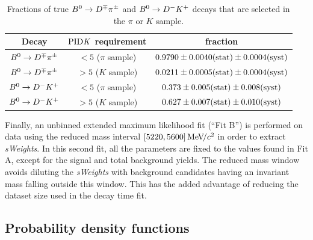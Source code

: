 \begin{table}[t]
	\begin{center}
		\caption{Fractions of true $B^0\rightarrow D^\mp\pi^\pm$ and $B^0\rightarrow D^-K^+$ decays that are
		selected in the $\pi$ or $K$ sample.}
		\begin{tabular}{ccc}
			\toprule
			Decay & $\rm{PID}\it{K}$ requirement & fraction\\
			\midrule
			$B^0\rightarrow D^\mp\pi^\pm$ & $<5$ ($\pi$ sample) & $0.9790\pm0.0040(\rm stat)\pm0.0004(\rm syst)$\\
			$B^0\rightarrow D^\mp\pi^\pm$ & $>5$ ($K$ sample) & $0.0211\pm0.0005(\rm stat)\pm0.0004(\rm syst)$\\
			\midrule
			$B^0\rightarrow D^-K^+$ & $<5$ ($\pi$ sample) & $0.373\pm0.005(\rm stat)\pm0.008(\rm syst)$\\
			$B^0\rightarrow D^-K^+$ & $>5$ ($K$ sample) & $0.627\pm0.007(\rm stat)\pm0.010(\rm syst)$\\
			\bottomrule
		\end{tabular}
		\label{tab:pideff}
	\end{center}
\end{table}

Finally, an unbinned extended maximum likelihood fit (``Fit B'') is performed on
data using the reduced mass interval $[5220,5600]{\mathrm{\,Me\kern -0.1em V\!/}c^2}$ in order to extract
\emph{sWeights}. In this second fit, all the parameters are fixed to the values
found in Fit A, except for the signal and total background yields. The reduced mass window avoids
diluting the \emph{sWeights} with background candidates having an invariant mass falling outside this window. This has
the added advantage of reducing the dataset size used in the decay time fit.

\subsection{Probability density functions}
\label{sec:pdf}

